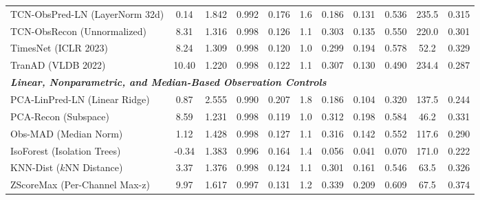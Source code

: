 \begin{table}[t]
\begin{tabular}{@{}lcccccccccc@{}}
TCN-ObsPred-LN (LayerNorm 32d) & 0.14 & 1.842 & 0.992 & 0.176 & 1.6 & 0.186 & 0.131 & 0.536 & 235.5 & 0.315 \\
TCN-ObsRecon (Unnormalized)    & 8.31 & 1.316 & 0.998 & 0.126 & 1.1 & 0.303 & 0.135 & 0.550 & 220.0 & 0.301 \\
TimesNet (ICLR 2023)           & 8.24 & 1.309 & 0.998 & 0.120 & 1.0 & 0.299 & 0.194 & 0.578 & 52.2 & 0.329 \\
TranAD (VLDB 2022)             & 10.40 & 1.220 & 0.998 & 0.122 & 1.1 & 0.307 & 0.130 & 0.490 & 234.4 & 0.287 \\
\midrule
\multicolumn{11}{l}{\textit{\textbf{Linear, Nonparametric, and Median-Based Observation Controls}}} \\
PCA-LinPred-LN (Linear Ridge)  & 0.87 & 2.555 & 0.990 & 0.207 & 1.8 & 0.186 & 0.104 & 0.320 & 137.5 & 0.244 \\
PCA-Recon (Subspace)           & 8.59 & 1.231 & 0.998 & 0.119 & 1.0 & 0.312 & 0.198 & 0.584 & 46.2 & 0.331 \\
Obs-MAD (Median Norm)          & 1.12 & 1.428 & 0.998 & 0.127 & 1.1 & 0.316 & 0.142 & 0.552 & 117.6 & 0.290 \\
IsoForest (Isolation Trees)    & -0.34 & 1.383 & 0.996 & 0.164 & 1.4 & 0.056 & 0.041 & 0.070 & 171.0 & 0.222 \\
KNN-Dist ($k$NN Distance)      & 3.37 & 1.376 & 0.998 & 0.124 & 1.1 & 0.301 & 0.161 & 0.546 & 63.5 & 0.326 \\
ZScoreMax (Per-Channel Max-z)  & 9.97 & 1.617 & 0.997 & 0.131 & 1.2 & 0.339 & 0.209 & 0.609 & 67.5 & 0.374 \\
\bottomrule
\end{tabular}
\end{table}

